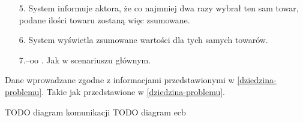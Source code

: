 \begin{usecase}
{\begin{enumerate}
       \item[5.] System informuje aktora, że co najmniej dwa razy wybrał ten sam towar, podane ilości towaru zostaną więc zsumowane.
       \item[6.] System wyświetla zsumowane wartości dla tych samych towarów.
       \item[7.--oo]. Jak w scenariuszu głównym.
       \end{enumerate}
  }
   {
    Dane wprowadzane zgodne z informacjami przedstawionymi w \ref{dziedzina-problemu}.
  }
   {
    Takie jak przedstawione w \ref{dziedzina-problemu}.
  }
\end{usecase}
TODO diagram komunikacji TODO diagram ecb
